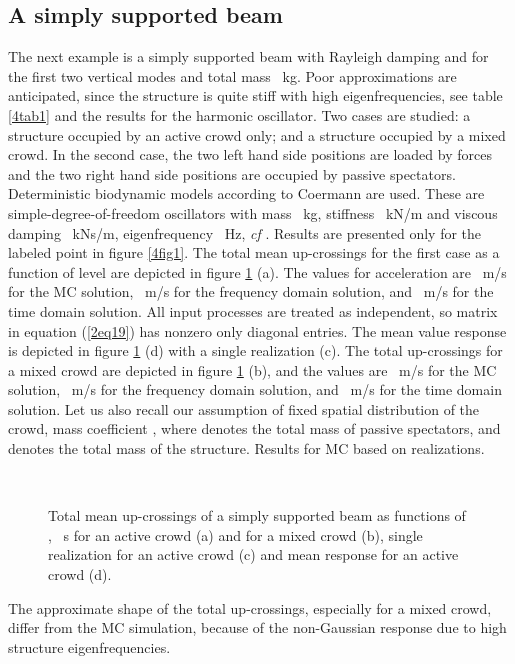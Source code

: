 \documentclass[preprint,12pt,authoryear]{elsarticle}
\begin{document}
\subsection{A simply supported beam}
\label{beam}
The next example is a simply supported beam with Rayleigh damping  and  for the first two vertical modes and total mass ~kg. Poor approximations are anticipated, since the structure is quite stiff with high eigenfrequencies, see table \ref{4tab1} and the results for the harmonic oscillator. Two cases are studied: a structure occupied by an active crowd only; and a structure occupied by a mixed crowd. In the second case, the two left hand side positions are loaded by forces and the two right hand side positions are occupied by passive spectators. Deterministic biodynamic models according to Coermann are used. These are simple-degree-of-freedom oscillators with mass ~kg, stiffness ~kN/m and viscous damping ~kNs/m, eigenfrequency ~Hz, \textit{cf} \citep{Sachse}. Results are presented only for the labeled point in figure \ref{4fig1}. The total mean up-crossings for the first case  as a function of level  are depicted in figure \ref{4fig4} (a). The  values for acceleration are ~m/s for the MC solution, ~m/s for the frequency domain solution, and ~m/s for the time domain solution. All input processes are treated as independent, so matrix  in equation (\ref{2eq19}) has nonzero only diagonal entries. The mean value response is depicted in figure \ref{4fig4} (d) with a single realization (c). The total up-crossings for a mixed crowd are depicted in figure \ref{4fig4} (b), and the  values are ~m/s for the MC solution, ~m/s for the frequency domain solution, and ~m/s for the time domain solution. Let us also recall our assumption of fixed spatial distribution of the crowd, mass coefficient , where  denotes the total mass of passive spectators, and  denotes the total mass of the structure. Results for MC based on  realizations.
\begin{figure}
	\centering
{}
\\
	\caption{Total mean up-crossings  of a simply supported beam as functions of , ~s for an active crowd (a) and for a mixed crowd (b), single realization for an active crowd (c) and mean response for an active crowd (d).}
	\label{4fig4}
\end{figure}
The approximate shape of the total up-crossings, especially for a mixed crowd, differ from the MC simulation, because of the non-Gaussian response due to high structure eigenfrequencies.
\end{document}
